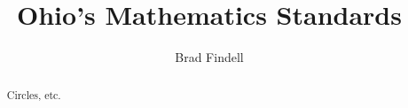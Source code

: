 \documentclass[numbers,nooutcomes,twoside,hints]{xourse}
\title{Ohio's Mathematics Standards}
\author{Brad Findell}
\begin{document}
\begin{abstract}
Circles, etc.
\end{abstract}
\maketitle






\end{document}
